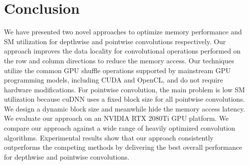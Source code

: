 \section{Conclusion}
We have presented two novel approaches to optimize memory performance and SM utilization for depthwise and pointwise convolutions respectively. 
Our approach improves the data locality for convolutional operations performed on the row and column directions to reduce the memory access. 
Our techniques utilize the common GPU shuffle operations supported by mainstream GPU programming models, including CUDA and OpenCL, and do not require hardware modifications.
For pointwise convolution, the main problem is low SM utilization because cuDNN uses a fixed block size for all pointwise convolutions. We design a dynamic block size and meanwhile hide the memory access latency. 
We evaluate our approach on an NVIDIA RTX 2080Ti GPU platform. 
We compare our approach against a wide range of heavily optimized convolution algorithms. 
Experimental results show that our approach consistently outperforms the competing methods by delivering the best overall performance for depthwise and pointwise convolutions.




